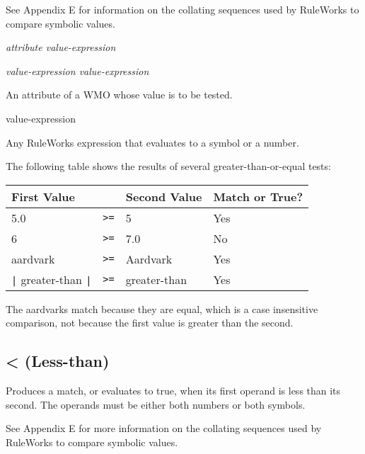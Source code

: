 See Appendix E for information on the collating sequences used by
RuleWorks to compare symbolic values.

\Format

\ct\it{attribute} \co{>=} \it{value-expression}

\it{value-expression} \co{>=} \it{value-expression}

\begin{operands}

\item[\ct{attribute}]

  An attribute of a WMO whose value is to be tested.

\item[value-expression]

  Any RuleWorks expression that evaluates to a symbol or a number.
\end{operands}

\Example

The following table shows the results of several greater-than-or-equal
tests:

\begin{center}
\begin{tabular}{lcll}
  \toprule
  First Value      &    & Second Value & Match or True? \\    
  \midrule
  5.0              & \verb|>=| & 5            & Yes            \\
  6                & \verb|>=| & 7.0          & No             \\
  aardvark         & \verb|>=| & Aardvark     & Yes            \\
  \verb,|, greater-than \verb,|, & \verb|>=| & greater-than & Yes            \\
  \bottomrule
\end{tabular}
\end{center}

The aardvarks match because they are equal, which is a case
insensitive comparison, not because the first value is greater than
the second.

\subsection{\co< (Less-than)}

Produces a match, or evaluates to true, when its first operand is less
than its second. The operands must be either both numbers or both
symbols.

See Appendix E for more information on the collating sequences used by
RuleWorks to compare symbolic values.

